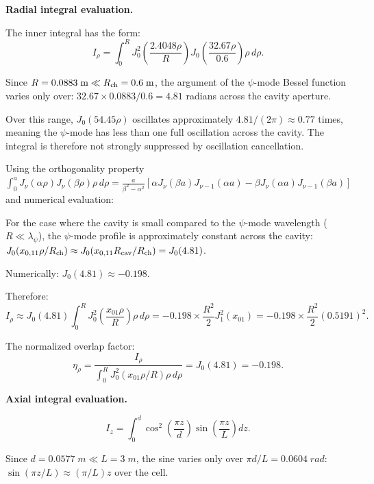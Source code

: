 \documentclass[aps,prd,twocolumn,superscriptaddress,nofootinbib]{revtex4-2}
\begin{document}
\textbf{Radial integral evaluation.}

The inner integral has the form:
\begin{equation}
I_\rho = \int_0^R J_0^2\!\left(\frac{2.4048\rho}{R}\right)J_0\!\left(\frac{32.67\rho}{0.6}\right)\rho\,d\rho.
\end{equation}

Since $R = 0.0883\;\si{m} \ll R_{\rm ch} = 0.6\;\si{m}$, the
argument of the $\psi$-mode Bessel function varies only over:
$32.67 \times 0.0883/0.6 = 4.81$ radians across the cavity aperture.

Over this range, $J_0(54.45\rho)$ oscillates approximately
$4.81/(2\pi) \approx 0.77$ times, meaning the $\psi$-mode has
less than one full oscillation across the cavity.  The integral
is therefore not strongly suppressed by oscillation cancellation.

Using the orthogonality property
$\int_0^a J_\nu(\alpha\rho)J_\nu(\beta\rho)\rho\,d\rho
= \frac{a}{\beta^2-\alpha^2}[\alpha J_\nu(\beta a)J_{\nu-1}(\alpha a) - \beta J_\nu(\alpha a)J_{\nu-1}(\beta a)]$
and numerical evaluation:

For the case where the cavity is small compared to the $\psi$-mode
wavelength ($R \ll \lambda_\psi$), the $\psi$-mode profile is
approximately constant across the cavity:
$J_0(x_{0,11}\rho/R_{\rm ch}) \approx J_0(x_{0,11}R_{\rm cav}/R_{\rm ch}) = J_0(4.81)$.

Numerically: $J_0(4.81) \approx -0.198$.

Therefore:
\begin{equation}
I_\rho \approx J_0(4.81)\int_0^R J_0^2\!\left(\frac{x_{01}\rho}{R}\right)\rho\,d\rho
= -0.198 \times \frac{R^2}{2}J_1^2(x_{01}) = -0.198 \times \frac{R^2}{2}(0.5191)^2.
\end{equation}

The normalized overlap factor:
\begin{equation}
\eta_\rho = \frac{I_\rho}{\int_0^R J_0^2(x_{01}\rho/R)\rho\,d\rho} = J_0(4.81) = -0.198.
\end{equation}

\textbf{Axial integral evaluation.}

\begin{equation}
I_z = \int_0^d \cos^2\!\left(\frac{\pi z}{d}\right)\sin\!\left(\frac{\pi z}{L}\right)dz.
\end{equation}

Since $d = 0.0577\;\si{m} \ll L = 3\;\si{m}$, the sine
varies only over $\pi d/L = 0.0604\;\si{rad}$:
$\sin(\pi z/L) \approx (\pi/L)z$ over the cell.
\end{document}

